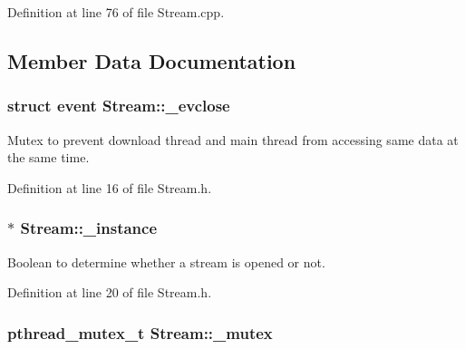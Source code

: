 Definition at line 76 of file Stream.cpp.



\subsection{Member Data Documentation}
\hypertarget{classStream_a764ba55d950220d7c4af19ae7a84ae96}{
\subsubsection[{\_\-evclose}]{\setlength{\rightskip}{0pt plus 5cm}struct event {\bf Stream::\_\-evclose}}}
\label{classStream_a764ba55d950220d7c4af19ae7a84ae96}


Mutex to prevent download thread and main thread from accessing same data at the same time. 



Definition at line 16 of file Stream.h.

\hypertarget{classStream_a504127347f6ada557e77642a8512a790}{
\subsubsection[{\_\-instance}]{ $\ast$ {\bf Stream::\_\-instance}}}
\label{classStream_a504127347f6ada557e77642a8512a790}


Boolean to determine whether a stream is opened or not. 



Definition at line 20 of file Stream.h.

\hypertarget{classStream_aea6eb94dcf571723cb7ca9a82b1f3231}{
\subsubsection[{\_\-mutex}]{\setlength{\rightskip}{0pt plus 5cm}pthread\_\-mutex\_\-t {\bf Stream::\_\-mutex}}}
\label{classStream_aea6eb94dcf571723cb7ca9a82b1f3231}


